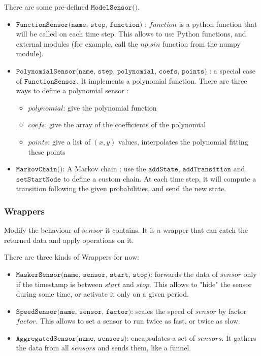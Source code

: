 There are some pre-defined $\texttt{ModelSensor()}$.

\begin{itemize}
    \item $\texttt{FunctionSensor(name, step, function)}$ : $function$ is a
python function that will be called on each time step. This allows to use Python
functions, and external modules (for example, call the $np.sin$ function from
the numpy module).
    \item $\texttt{PolynomialSensor(name, step, polynomial, coefs, points)}$ : a
special case of $\texttt{FunctionSensor}$. It implements a polynomial function.
There are three ways to define a polynomial sensor :
    \begin{itemize}
        \item $polynomial$: give the polynomial function
        \item $coefs$: give the array of the coefficients of the polynomial
        \item $points$: give a list of $(x, y)$ values, interpolates the
        polynomial fitting these points
    \end{itemize}
    \item $\texttt{MarkovChain()}$: A Markov chain : use the $\texttt{addState}$,
    $\texttt{addTransition}$ and $\texttt{setStartNode}$ to define a custom chain.
    At each time step, it will compute a transition following the given
    probabilities, and send the new state.
\end{itemize}

\subsubsection{Wrappers}
Modify the behaviour of $sensor$ it contains. It is a wrapper that can catch the
returned data and apply operations on it.

There are three kinds of Wrappers for now:
\begin{itemize}
    \item $\texttt{MaskerSensor(name, sensor, start, stop)}$: forwards the data
of $sensor$ only if the timestamp is between $start$ and $stop$. This allows to
"hide" the sensor during some time, or activate it only on a given period.
    \item $\texttt{SpeedSensor(name, sensor, factor)}$: scales the speed of
$sensor$ by factor $factor$. This allows to set a sensor to run twice as fast,
or twice as slow.
    \item $\texttt{AggregatedSensor(name, sensors)}$: encapsulates a set of
$sensors$. It gathers the data from all $sensors$ and sends them, like a funnel.
\end{itemize}


